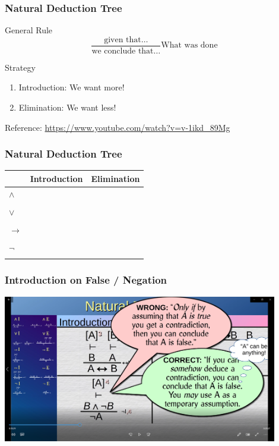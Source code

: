 \documentclass{beamer}
\begin{document}
\begin{frame}
    \frametitle{Natural Deduction Tree}
    \Large{
    \begin{block}{{\Large General Rule}}
        $$\frac{\text{given that}\dots}{\text{we conclude that}\dots} \text{What was done}$$
    \end{block}
    }
    \Large{
        \begin{block}{{\Large Strategy}}
            \begin{enumerate}
                \item Introduction: We want more!
                \item Elimination: We want less!
            \end{enumerate}
        \end{block}
    }
    Reference: \url{https://www.youtube.com/watch?v=v-1ikd_89Mg}
\end{frame}
\begin{frame}
    \frametitle{Natural Deduction Tree}
    \begin{table}[htbp]
        \begin{tabular}{|p{3mm}|>{\centering\arraybackslash}p{4.5cm}|>{\centering\arraybackslash}p{4.5cm}|}
        \toprule
        & Introduction & Elimination \\
        \midrule
        \rule{0pt}{0.6em} $\wedge$ &  & \\
        \rule{0pt}{0.6em} &  & \\
        \rule{0pt}{0.6em} $\vee$ &  & \\
        \rule{0pt}{0.6em} &  & \\
        \rule{0pt}{0.6em} $\rightarrow$ &  & \\
        \rule{0pt}{0.6em} &  & \\
        \rule{0pt}{0.6em} $\neg$ &  & \\
        \rule{0pt}{0.6em} &  & \\
        \bottomrule
        \end{tabular}
    \end{table}
\end{frame}
\begin{frame}
    \frametitle{Introduction on False / Negation}
    \centering
    \includegraphics[width=0.9\textwidth]{elimination.png}
    
\end{frame}
\end{document}
